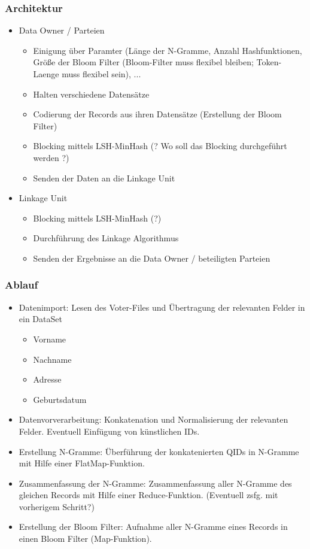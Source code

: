 \documentclass{beamer}
\begin{document}
    \begin{frame}
    		\frametitle{Architektur}
    		
		\begin{itemize}
			\item Data Owner / Parteien
				\begin{itemize}
					\item Einigung über Paramter (Länge der N-Gramme, Anzahl Hashfunktionen,
					Größe der Bloom Filter (Bloom-Filter muss flexibel bleiben; Token-Laenge muss flexibel sein), ...
					\item Halten verschiedene Datensätze
					\item Codierung der Records aus ihren Datensätze (Erstellung der Bloom Filter)
					\item Blocking mittels LSH-MinHash 
					(? Wo soll das Blocking durchgeführt werden ?)
					\item Senden der Daten an die Linkage Unit
				\end{itemize}
			\item Linkage Unit
				\begin{itemize}
					\item Blocking mittels LSH-MinHash (?)
					\item Durchführung des Linkage Algorithmus
					\item Senden der Ergebnisse an die Data Owner / beteiligten Parteien
				\end{itemize}	
		\end{itemize}    		  
    \end{frame}



    \begin{frame}
    		\frametitle{Ablauf}  

		\begin{itemize}
			\item Datenimport: Lesen des Voter-Files und Übertragung der relevanten Felder in
			 ein DataSet
			\begin{itemize}
				\item Vorname
				\item Nachname
				\item Adresse
				\item Geburtsdatum
			\end{itemize}
			\item Datenvorverarbeitung: Konkatenation und Normalisierung der relevanten
			 Felder. Eventuell Einfügung von künstlichen IDs.
			\item Erstellung N-Gramme: Überführung der konkatenierten QIDs in N-Gramme mit
			 Hilfe einer FlatMap-Funktion.
			\item Zusammenfassung der N-Gramme: Zusammenfassung aller N-Gramme des
			 gleichen Records mit Hilfe einer Reduce-Funktion. (Eventuell zsfg. mit vorherigem
			  Schritt?)
			\item Erstellung der Bloom Filter: Aufnahme aller N-Gramme eines Records in einen
			 Bloom Filter (Map-Funktion).
		\end{itemize}
		
    \end{frame}
\end{document}
